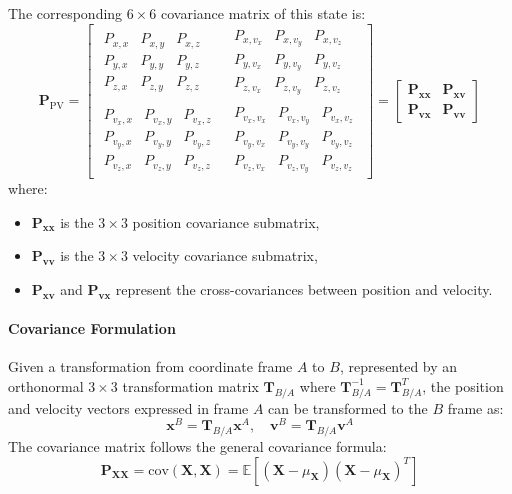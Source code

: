 \documentclass[11pt,fleqn]{report}
\begin{document}
The corresponding $6 \times 6$ covariance matrix of this state is:
\[
\mathbf{P}_{\text{PV}} =
\left[
\begin{array}{c|c}
\begin{array}{ccc}
P_{x,x} & P_{x,y} & P_{x,z} \\
P_{y,x} & P_{y,y} & P_{y,z} \\
P_{z,x} & P_{z,y} & P_{z,z}
\end{array}
&
\begin{array}{ccc}
P_{x,v_x} & P_{x,v_y} & P_{x,v_z} \\
P_{y,v_x} & P_{y,v_y} & P_{y,v_z} \\
P_{z,v_x} & P_{z,v_y} & P_{z,v_z}
\end{array}
\\ \hline
\begin{array}{ccc}
P_{v_x,x} & P_{v_x,y} & P_{v_x,z} \\
P_{v_y,x} & P_{v_y,y} & P_{v_y,z} \\
P_{v_z,x} & P_{v_z,y} & P_{v_z,z}
\end{array}
&
\begin{array}{ccc}
P_{v_x,v_x} & P_{v_x,v_y} & P_{v_x,v_z} \\
P_{v_y,v_x} & P_{v_y,v_y} & P_{v_y,v_z} \\
P_{v_z,v_x} & P_{v_z,v_y} & P_{v_z,v_z}
\end{array}
\end{array}
\right]
= 
\begin{bmatrix}
\mathbf{P_{xx}} & \mathbf{P_{xv}} \\
\mathbf{P_{vx}} & \mathbf{P_{vv}}
\end{bmatrix}
\]
where:
\begin{itemize}
\item $\mathbf{P_{xx}}$ is the $3 \times 3$ position covariance submatrix,
\item $\mathbf{P_{vv}}$ is the $3 \times 3$ velocity covariance submatrix,
\item $\mathbf{P_{xv}}$ and $\mathbf{P_{vx}}$ represent the cross-covariances between position and velocity.
\end{itemize}

\paragraph{Covariance Formulation}
Given a transformation from coordinate frame $A$ to $B$, 
represented by an orthonormal $3 \times 3$ transformation matrix 
$\mathbf{T}_{B/A}$ where $\mathbf{T}_{B/A}^{-1} = \mathbf{T}_{B/A}^T$, 
the position and velocity vectors expressed in frame $A$ can be 
transformed to the $B$ frame as:
\[
\mathbf{x}^B = \mathbf{T}_{B/A} \mathbf{x}^A, \quad
\mathbf{v}^B = \mathbf{T}_{B/A} \mathbf{v}^A
\]
The covariance matrix follows the general covariance formula:
\[
\mathbf{P_{XX}} = \text{cov}(\mathbf{X},\mathbf{X}) = \mathbb{E}[(\mathbf{X}-\mu_\mathbf{X})(\mathbf{X}-\mu_\mathbf{X})^T]
\]
\end{document}

